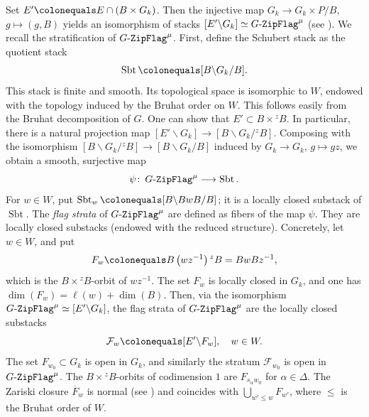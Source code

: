 \documentclass[11pt]{amsart}
\numberwithin{equation}{section}
\theoremstyle{definition}
\theoremstyle{remark}
\newcommand{\GF}{\mathop{\text{$G$-{\tt ZipFlag}}}\nolimits}
\newcommand{\Fcal}{{\mathcal F}}
\DeclareMathOperator{\Sbt}{Sbt}
\newcommand{\lra}{\longrightarrow}
\begin{document}
Set $E' \colonequals E\cap (B\times G_k)$. Then the injective map $G_k \to G_k \times P/B$, $g\mapsto (g,B)$ yields an isomorphism of stacks $[E' \backslash G_k]\simeq \GF^\mu$ (see \cite[Equation~(2.1.5)]{Goldring-Koskivirta-Strata-Hasse}). We recall the stratification of $\GF^\mu$. First, define the Schubert stack as the quotient stack
\begin{equation}\label{equ-def-Sbt}
\Sbt \colonequals [B\backslash G_k /B].
\end{equation}
This stack is finite and smooth. Its topological space is isomorphic to $W$, endowed with the topology induced by the Bruhat order on $W$. This follows easily from the Bruhat decomposition of $G$. One can show that $E'\subset B\times {}^z B$. In particular, there is a natural projection map $[E'\backslash G_k]\to [B\backslash G_k/{}^z\! B]$. Composing with the isomorphism $[B\backslash G_k/{}^z B]\to [B\backslash G_k/B]$ induced by $G_k\to G_k$, $g\mapsto gz$, we obtain a smooth, surjective map
 \begin{equation}\label{eq-GF-to-Sbt}
     \psi  \colon  \GF^\mu \lra \Sbt.
 \end{equation}
For $w\in W$, put $\Sbt_w\colonequals [B\backslash BwB /B]$; it is a locally closed substack of $\Sbt$. The \emph{flag strata} of $\GF^\mu$ are defined as fibers of the map $\psi$. They are locally closed substacks (endowed with the reduced structure). Concretely, let $w\in W$, and put
\begin{equation}
F_w \colonequals B\left(wz^{-1}\right){}^zB=BwBz^{-1},
\end{equation} 
which is the $B\times {}^zB$-orbit of $wz^{-1}$. The set $F_w$ is locally closed in $G_k$, and one has $\dim(F_w)=\ell(w)+\dim(B)$. Then, via the isomorphism $\GF^\mu\simeq [E'\backslash G_k]$, the flag strata of $\GF^\mu$ are the locally closed substacks
\begin{equation}\label{zipflag-Cw}
\Fcal_w \colonequals [E'\backslash F_w], \quad w\in W.    
\end{equation}
The set $F_{w_0}\subset G_k$ is open in $G_k$, and similarly the stratum $\Fcal_{w_0}$ is open in $\GF^\mu$. The $B\times {}^zB$-orbits of codimension $1$ are $F_{s_\alpha w_0}$ for $\alpha\in \Delta$. The Zariski closure $\overline{F}_w$ is normal (see \cite[Theorem 3]{Ramanan-Ramanathan-projective-normality}) and coincides with $\bigcup_{w'\leq w}F_{w'}$, where $\leq$ is the Bruhat order of $W$.
\end{document}
